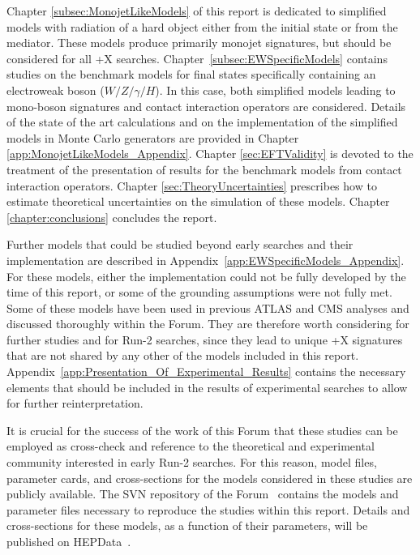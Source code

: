 Chapter \ref{subsec:MonojetLikeModels} of this report is dedicated to simplified
models with radiation of a hard object either from the initial state
or from the mediator. These models produce primarily monojet signatures, 
but should be considered for all \MET{}+X searches.
Chapter~\ref{subsec:EWSpecificModels} contains studies on the benchmark models
for final states specifically containing an electroweak 
boson ($W/Z/\gamma/H$). In this case, both 
simplified models leading to mono-boson signatures
and contact interaction operators are considered. 
Details of the state of the art calculations and on the implementation of the simplified models in
Monte Carlo generators are provided in
Chapter \ref{app:MonojetLikeModels_Appendix}.
Chapter \ref{sec:EFTValidity} is devoted to the treatment of the presentation of results for the benchmark
models from contact interaction operators. 
Chapter \ref{sec:TheoryUncertainties} prescribes how to estimate theoretical uncertainties on the simulation of these models. 
Chapter \ref{chapter:conclusions} concludes the report.

Further models that could be studied
beyond early searches and their implementation are described in Appendix~\ref{app:EWSpecificModels_Appendix}. 
For these models, either the implementation could not be fully developed by the time of this report,
or some of the grounding assumptions were not fully met.  
Some of these models have been used in previous ATLAS and CMS analyses and discussed thoroughly within the Forum. 
They are therefore worth considering for further studies and for Run-2 searches, since they lead to unique \MET{}+X signatures 
that are not shared by any other of the models included in this report. 
Appendix~\ref{app:Presentation_Of_Experimental_Results} contains the necessary elements that
should be included in the results of experimental searches to allow for further reinterpretation. 

It is crucial for the success of the work of this Forum that these studies can be employed as cross-check
and reference to the theoretical and experimental community interested in early Run-2 searches. 
For this reason, model files, parameter cards, and cross-sections for the models considered in these studies 
are publicly available. The SVN repository of the Forum~\cite{ForumSVN} contains the models and parameter files
necessary to reproduce the studies within this report. Details and cross-sections for these models, 
as a function of their parameters, will be published on HEPData~\cite{HEPData}. 

